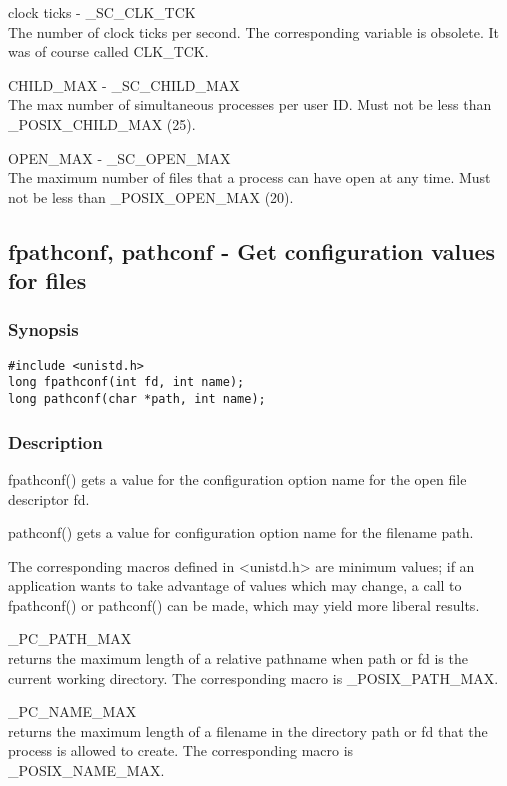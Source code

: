 \begin{description}
	\item clock ticks - \_SC\_CLK\_TCK \hfill \\
		The number of clock ticks per second.  The corresponding variable is obsolete.  It  was  of  course  called  CLK\_TCK.
	\item CHILD\_MAX - \_SC\_CHILD\_MAX \hfill \\
		The max number of simultaneous processes per user ID.  Must not be less than \_POSIX\_CHILD\_MAX (25).
	\item OPEN\_MAX - \_SC\_OPEN\_MAX \hfill \\
		The maximum number of files that a process can have open at any time.  Must not be less than \_POSIX\_OPEN\_MAX (20).
\end{description}

\subsection{fpathconf, pathconf - Get configuration values for files}

\subsubsection{Synopsis}

\begin{lstlisting}
#include <unistd.h>
long fpathconf(int fd, int name);
long pathconf(char *path, int name);
\end{lstlisting}

\subsubsection{Description}

fpathconf() gets a value for the configuration option name for the open file descriptor fd.

pathconf() gets a value for configuration option name for the filename path.

The corresponding macros defined in <unistd.h> are minimum values; if an application wants to take advantage of values which may change, a call to fpathconf() or pathconf() can be made, which may yield more liberal results.

\begin{description}
	\item \_PC\_PATH\_MAX \hfill \\
		returns the maximum length of a relative pathname when path or fd is the current working directory.  The  corresponding macro is \_POSIX\_PATH\_MAX.  
	\item \_PC\_NAME\_MAX \hfill \\
		returns the maximum length of a filename in the directory path or fd that the process is allowed to create.  The corresponding macro is \_POSIX\_NAME\_MAX.
\end{description}


